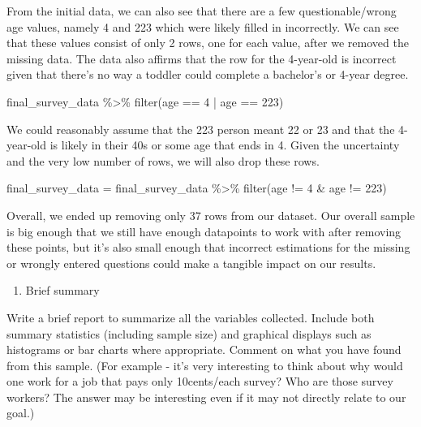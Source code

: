 \documentclass[
]{article}
\newenvironment{Shaded}{\begin{snugshade}}{\end{snugshade}}
\newcommand{\DecValTok}[1]{\textcolor[rgb]{0.00,0.00,0.81}{#1}}
\newcommand{\FunctionTok}[1]{\textcolor[rgb]{0.00,0.00,0.00}{#1}}
\newcommand{\NormalTok}[1]{#1}
\newcommand{\OtherTok}[1]{\textcolor[rgb]{0.56,0.35,0.01}{#1}}
\newcommand{\SpecialCharTok}[1]{\textcolor[rgb]{0.00,0.00,0.00}{#1}}
\providecommand{\tightlist}{%
  \setlength{\itemsep}{0pt}\setlength{\parskip}{0pt}}
\begin{document}
From the initial data, we can also see that there are a few
questionable/wrong age values, namely 4 and 223 which were likely filled
in incorrectly. We can see that these values consist of only 2 rows, one
for each value, after we removed the missing data. The data also affirms
that the row for the 4-year-old is incorrect given that there's no way a
toddler could complete a bachelor's or 4-year degree.

\begin{Shaded}
\begin{Highlighting}[]
\NormalTok{final\_survey\_data }\SpecialCharTok{\%\textgreater{}\%} \FunctionTok{filter}\NormalTok{(age }\SpecialCharTok{==} \DecValTok{4} \SpecialCharTok{|}\NormalTok{ age }\SpecialCharTok{==} \DecValTok{223}\NormalTok{)}
\end{Highlighting}
\end{Shaded}

We could reasonably assume that the 223 person meant 22 or 23 and that
the 4-year-old is likely in their 40s or some age that ends in 4. Given
the uncertainty and the very low number of rows, we will also drop these
rows.

\begin{Shaded}
\begin{Highlighting}[]
\NormalTok{final\_survey\_data }\OtherTok{=}\NormalTok{ final\_survey\_data }\SpecialCharTok{\%\textgreater{}\%} \FunctionTok{filter}\NormalTok{(age }\SpecialCharTok{!=} \DecValTok{4} \SpecialCharTok{\&}\NormalTok{ age }\SpecialCharTok{!=} \DecValTok{223}\NormalTok{)}
\end{Highlighting}
\end{Shaded}

Overall, we ended up removing only 37 rows from our dataset. Our overall
sample is big enough that we still have enough datapoints to work with
after removing these points, but it's also small enough that incorrect
estimations for the missing or wrongly entered questions could make a
tangible impact on our results.

\begin{enumerate}
\def\labelenumi{\roman{enumi}.}
\setcounter{enumi}{2}
\tightlist
\item
  Brief summary
\end{enumerate}

Write a brief report to summarize all the variables collected. Include
both summary statistics (including sample size) and graphical displays
such as histograms or bar charts where appropriate. Comment on what you
have found from this sample. (For example - it's very interesting to
think about why would one work for a job that pays only 10cents/each
survey? Who are those survey workers? The answer may be interesting even
if it may not directly relate to our goal.)
\end{document}
